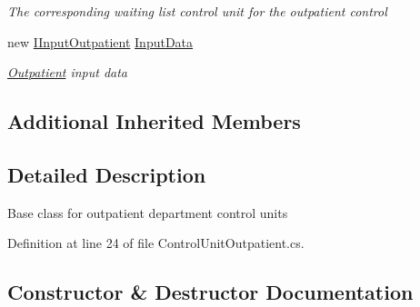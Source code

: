 \begin{DoxyCompactItemize}
\begin{DoxyCompactList}\small\item\em The corresponding waiting list control unit for the outpatient control \end{DoxyCompactList}\item 
new \hyperlink{interface_general_health_care_elements_1_1_department_models_1_1_outpatient_1_1_i_input_outpatient}{I\+Input\+Outpatient} \hyperlink{class_general_health_care_elements_1_1_department_models_1_1_outpatient_1_1_control_unit_outpatient_a8baf50eee922235245e9425cb0f3cd52}{Input\+Data}
\begin{DoxyCompactList}\small\item\em \hyperlink{namespace_general_health_care_elements_1_1_department_models_1_1_outpatient}{Outpatient} input data \end{DoxyCompactList}\end{DoxyCompactItemize}
\subsection*{Additional Inherited Members}


\subsection{Detailed Description}
Base class for outpatient department control units 



Definition at line 24 of file Control\+Unit\+Outpatient.\+cs.



\subsection{Constructor \& Destructor Documentation}
